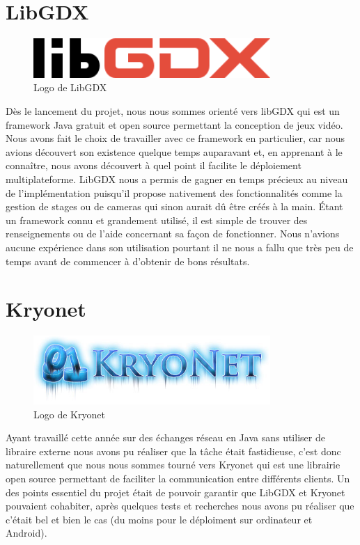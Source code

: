 \documentclass{report}
\begin{document}
\chapter{LibGDX}
\begin{figure}[H]
	\centering\includegraphics[width=9cm]{libgdx}
	\caption{Logo de LibGDX}
\end{figure}
Dès le lancement du projet, nous nous sommes orienté vers libGDX qui est un
framework Java gratuit et open source permettant la conception de jeux vidéo.
Nous avons fait le choix de travailler avec ce framework en particulier, car
nous avions découvert son existence quelque temps auparavant et, en apprenant à le connaître,
nous avons découvert à quel point il facilite le déploiement multiplateforme.
LibGDX nous a permis de gagner en temps précieux au niveau de l’implémentation
puisqu’il propose nativement des fonctionnalités comme la gestion de stages ou
de cameras qui sinon aurait dû être créés à la main.
Étant un framework connu et grandement utilisé, il est simple de trouver des
renseignements ou de l’aide concernant sa façon de fonctionner. Nous n’avions
aucune expérience dans son utilisation pourtant il ne nous a fallu que très peu
 de temps avant de commencer à d’obtenir de bons résultats.

\chapter{Kryonet}
\begin{figure}[H]
	\centering\includegraphics[width=9cm]{kryonet}
	\caption{Logo de Kryonet}
\end{figure}
Ayant travaillé cette année sur des échanges réseau en Java sans utiliser de libraire externe nous avons pu réaliser que la tâche était fastidieuse, c'est donc naturellement que nous
nous sommes tourné vers Kryonet qui est une librairie open source permettant de faciliter la communication entre différents clients. Un des points essentiel du projet était de pouvoir
garantir que LibGDX et Kryonet pouvaient cohabiter, après quelques tests et recherches nous avons pu réaliser que c'était bel et bien le cas (du moins pour le déploiment sur ordinateur et Android).
\end{document}
